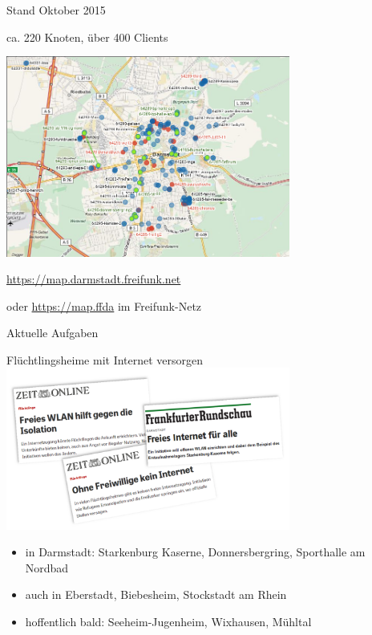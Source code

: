 \documentclass[10pt,handout]{beamer}
\begin{document}
\begin{frame}{Stand Oktober 2015}
	\begin{center}
		\vfill
		ca. 220 Knoten, über 400 Clients
		\begin{center}
			\includegraphics[width=0.7\textwidth]{images/2015-10-03_darmstadt-map}
		\end{center}

		\vfill
		\url{https://map.darmstadt.freifunk.net}
		
		\tiny oder \url{https://map.ffda} im Freifunk-Netz
	\end{center}	
\end{frame}

\begin{frame}{Aktuelle Aufgaben}
	\begin{center}
		\large Flüchtlingsheime mit Internet versorgen \\
		\includegraphics[width=0.7\textwidth]{images/2015-10_presse-fluechtlinge}
	\end{center}
	\begin{itemize}[<+->]
		\item in Darmstadt: Starkenburg Kaserne, Donnersbergring, Sporthalle am Nordbad
		\item auch in Eberstadt, Biebesheim, Stockstadt am Rhein
		\item hoffentlich bald: Seeheim-Jugenheim, Wixhausen, Mühltal
	\end{itemize}	
\end{frame}	
\end{document}
